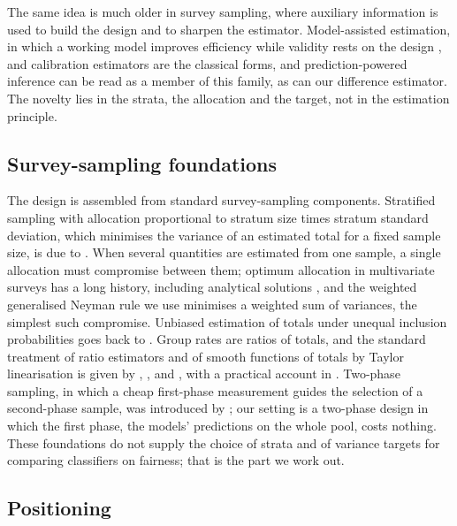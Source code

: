 The same idea is much older in survey sampling, where auxiliary information is used to build the design and to sharpen the estimator. Model-assisted estimation, in which a working model improves efficiency while validity rests on the design \citep{sarndal1992,breidt2017}, and calibration estimators \citep{deville1992} are the classical forms, and prediction-powered inference can be read as a member of this family, as can our difference estimator. The novelty lies in the strata, the allocation and the target, not in the estimation principle.

\subsection{Survey-sampling foundations}

The design is assembled from standard survey-sampling components. Stratified sampling with allocation proportional to stratum size times stratum standard deviation, which minimises the variance of an estimated total for a fixed sample size, is due to \citet{neyman1934}. When several quantities are estimated from one sample, a single allocation must compromise between them; optimum allocation in multivariate surveys has a long history, including analytical solutions \citep{kokan1967}, and the weighted generalised Neyman rule we use minimises a weighted sum of variances, the simplest such compromise. Unbiased estimation of totals under unequal inclusion probabilities goes back to \citet{horvitz1952}. Group rates are ratios of totals, and the standard treatment of ratio estimators and of smooth functions of totals by Taylor linearisation is given by \citet{woodruff1971}, \citet{binder1983}, \citet{sarndal1992} and \citet{wolter2007}, with a practical account in \citet{lumley2010}. Two-phase sampling, in which a cheap first-phase measurement guides the selection of a second-phase sample, was introduced by \citet{neyman1938}; our setting is a two-phase design in which the first phase, the models' predictions on the whole pool, costs nothing. These foundations do not supply the choice of strata and of variance targets for comparing classifiers on fairness; that is the part we work out.

\subsection{Positioning}

